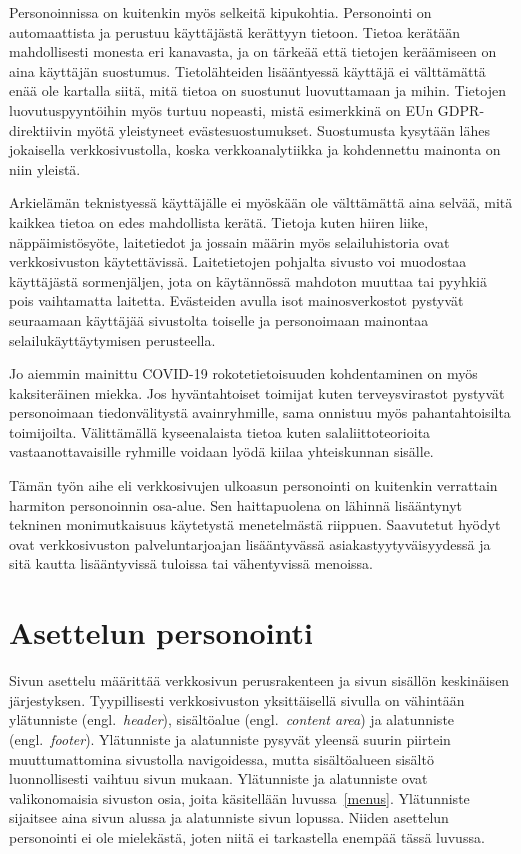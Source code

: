 \documentclass[finnish, 12pt, a4paper, elec, utf8, a-1b, online]{aaltothesis}
\begin{document}
Personoinnissa on kuitenkin myös selkeitä kipukohtia. Personointi on
automaattista ja perustuu käyttäjästä kerättyyn tietoon. Tietoa kerätään
mahdollisesti monesta eri kanavasta, ja on tärkeää että tietojen keräämiseen on
aina käyttäjän suostumus. Tietolähteiden lisääntyessä käyttäjä ei välttämättä
enää ole kartalla siitä, mitä tietoa on suostunut luovuttamaan ja mihin.
Tietojen luovutuspyyntöihin myös turtuu nopeasti, mistä esimerkkinä on EUn
GDPR-direktiivin myötä yleistyneet evästesuostumukset. Suostumusta kysytään
lähes jokaisella verkkosivustolla, koska verkkoanalytiikka ja kohdennettu
mainonta on niin yleistä.

Arkielämän teknistyessä käyttäjälle ei myöskään ole välttämättä aina selvää,
mitä kaikkea tietoa on edes mahdollista kerätä. Tietoja kuten hiiren liike,
näppäimistösyöte, laitetiedot ja jossain määrin myös selailuhistoria ovat
verkkosivuston käytettävissä. Laitetietojen pohjalta sivusto voi muodostaa
käyttäjästä sormenjäljen, jota on käytännössä mahdoton muuttaa tai pyyhkiä pois
vaihtamatta laitetta. Evästeiden avulla isot mainosverkostot pystyvät seuraamaan
käyttäjää sivustolta toiselle ja personoimaan mainontaa selailukäyttäytymisen
perusteella.

Jo aiemmin mainittu COVID-19 rokotetietoisuuden kohdentaminen on myös
kaksiteräinen miekka. Jos hyväntahtoiset toimijat kuten terveysvirastot pystyvät
personoimaan tiedonvälitystä avainryhmille, sama onnistuu myös pahantahtoisilta
toimijoilta. Välittämällä kyseenalaista tietoa kuten salaliittoteorioita
vastaanottavaisille ryhmille voidaan lyödä kiilaa yhteiskunnan sisälle.

Tämän työn aihe eli verkkosivujen ulkoasun personointi on kuitenkin verrattain
harmiton personoinnin osa-alue. Sen haittapuolena on lähinnä lisääntynyt
tekninen monimutkaisuus käytetystä menetelmästä riippuen. Saavutetut hyödyt ovat
verkkosivuston palveluntarjoajan lisääntyvässä asiakastyytyväisyydessä ja sitä
kautta lisääntyvissä tuloissa tai vähentyvissä menoissa.

\clearpage

\section{Asettelun personointi}\label{layout-personalization}

Sivun asettelu määrittää verkkosivun perusrakenteen ja sivun sisällön
keskinäisen järjestyksen. Tyypillisesti verkkosivuston yksittäisellä sivulla on
vähintään ylätunniste (engl.\ \textit{header}), sisältöalue (engl.\
\textit{content area}) ja alatunniste (engl.\ \textit{footer}). Ylätunniste ja
alatunniste pysyvät yleensä suurin piirtein muuttumattomina sivustolla
navigoidessa, mutta sisältöalueen sisältö luonnollisesti vaihtuu sivun mukaan.
Ylätunniste ja alatunniste ovat valikonomaisia sivuston osia, joita käsitellään
luvussa~\ref{menus}. Ylätunniste sijaitsee aina sivun alussa ja alatunniste
sivun lopussa. Niiden asettelun personointi ei ole mielekästä, joten niitä ei
tarkastella enempää tässä luvussa.
\end{document}
